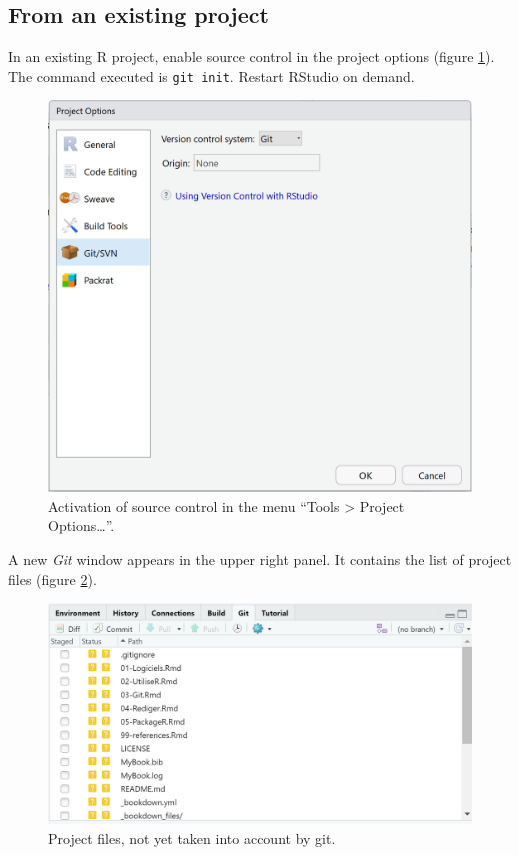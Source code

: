 \documentclass[
  12pt,
  american,
  a4paper,
  extrafontsizes,onecolumn,openright
  ]{memoir}
\begin{document}
\subsection{From an existing project}\label{from-an-existing-project}

In an existing R project, enable source control in the project options (figure \ref{fig:git-Project}).
The command executed is \texttt{git\ init}.
Restart RStudio on demand.



\scriptsize

\begin{figure}

{\centering \includegraphics[width=0.8\linewidth]{images/git-Project} 

}

\caption{Activation of source control in the menu \enquote{Tools \textgreater{} Project Options\ldots{}}.}\label{fig:git-Project}
\end{figure}

\normalsize

A new \emph{Git} window appears in the upper right panel.
It contains the list of project files (figure \ref{fig:git-Fichiers}).



\scriptsize

\begin{figure}

{\centering \includegraphics[width=0.8\linewidth]{images/git-Fichiers} 

}

\caption{Project files, not yet taken into account by git.}\label{fig:git-Fichiers}
\end{figure}
\end{document}
